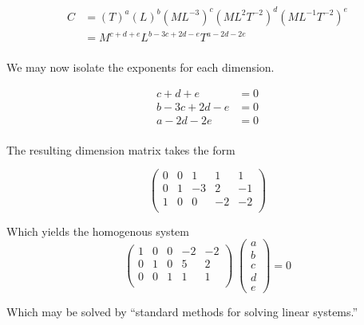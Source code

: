 \documentclass[12pt]{article}
\begin{document}
  \begin{equation}
    \label{eq:4-p-ne-step-1}
    \begin{aligned}
      C &= {(T)}^a{(L)}^b{(ML^{-3})}^c{(ML^2T^{-2})}^d{(ML^{-1}T^{-2})}^e \\
        &= M^{c+d+e}L^{b-3c+2d-e}T^{a-2d-2e} \\
    \end{aligned}
  \end{equation}

  We may now isolate the exponents for each dimension.

  \begin{equation}
    \label{eq:4-p-ne-step-2}
    \begin{aligned}
      c + d + e &= 0 \\
      b - 3c + 2d - e &= 0 \\
      a - 2d - 2e &= 0 \\
    \end{aligned}
  \end{equation}

  The resulting dimension matrix takes the form

  \begin{equation}
    \begin{pmatrix}
      0 & 0 & 1 & 1 & 1 \\
      0 & 1 & -3 & 2 & -1 \\
      1 & 0 & 0 & -2 & -2 \\
    \end{pmatrix}
  \end{equation}

  Which yields the homogenous system
  \begin{equation}
    \begin{pmatrix}
      1 & 0 & 0 & -2 & -2 \\
      0 & 1 & 0 & 5 & 2 \\
      0 & 0 & 1 & 1 & 1 \\
    \end{pmatrix} \;
    \begin{pmatrix}
      a \\ b \\ c \\ d \\ e
    \end{pmatrix}
    = 0
  \end{equation}

  Which may be solved by ``standard methods for solving linear systems.''
\end{document}
